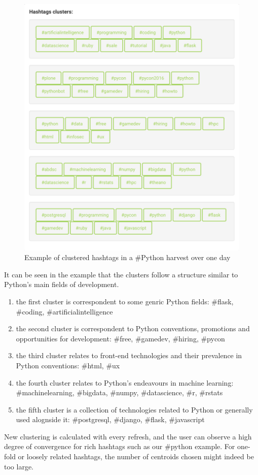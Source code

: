 \begin{figure}[ht]
    \centering
\includegraphics[width=0.7\columnwidth]{img/clusters.png}
    \caption{Example of clustered hashtags in a \#Python harvest over one day}
    \label{fig:clusters}
\end{figure}

It can be seen in the example that the clusters follow a structure similar to Python's main fields of development.

\begin{enumerate}
\item the first cluster is correspondent to some genric Python fields: \#flask, \#coding, \#artificialintelligence
\item the second cluster is correspondent to Python conventions, promotions and opportunities for development: \#free, \#gamedev, \#hiring, \#pycon
\item the third cluster relates to front-end technologies and their prevalence in Python conventions: \#html, \#ux
\item the fourth cluster relates to Python's endeavours in machine learning: \#machinelearning, \#bigdata, \#numpy, \#datascience, \#r, \#rstats
\item the fifth cluster is a collection of technologies related to Python or generally used alognside it: \#postgresql, \#django, \#flask, \#javascript
\end{enumerate}

New clustering is calculated with every refresh, and the user can observe a high degree of convergence for rich hashtags such as our \#python example. For one-fold or loosely related hashtags, the number of centroids chosen might indeed be too large.

